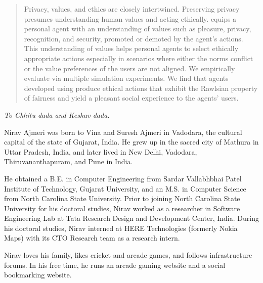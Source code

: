 \begin{abstract}
Privacy, values, and ethics are closely intertwined. Preserving privacy presumes  understanding human values and acting ethically. \frameworkAinur equips a personal agent with an understanding of values such as pleasure, privacy, recognition, and security, promoted or demoted by the agent's actions. This understanding of values helps personal agents to select ethically appropriate actions especially in scenarios where either the norms conflict or the value preferences of the users are not aligned.  We empirically evaluate \frameworkAinur via multiple simulation experiments. We find that agents developed using \frameworkAinur produce ethical actions that exhibit the Rawlsian property of fairness and yield a pleasant social experience to the agents' users.
\end{abstract}


\makecopyrightpage

\maketitlepage

\begin{dedication}
  \centering 
  \emph{To Chhitu dada and Keshav dada.}
\end{dedication}

\begin{biography}
Nirav Ajmeri was born to Vina and Suresh Ajmeri in Vadodara, the cultural capital of the state of Gujarat, India. He grew up in the sacred city of Mathura in Uttar Pradesh, India, and later lived in New Delhi, Vadodara, Thiruvananthapuram, and Pune in India. 

He obtained a B.E. in Computer Engineering from Sardar Vallabhbhai Patel Institute of Technology, Gujarat University, 
and an M.S. in Computer Science from North Carolina State University. 
Prior to joining North Carolina State University for his doctoral studies, Nirav worked as a researcher in Software Engineering Lab at Tata Research Design and Development Center, India. During his doctoral studies, Nirav interned at HERE Technologies (formerly Nokia Maps) with its CTO Research team as a research intern. 

Nirav loves his family, likes cricket and arcade games, and follows infrastructure forums. 
In his free time, he runs an arcade gaming website and a social bookmarking website. 
\end{biography}

